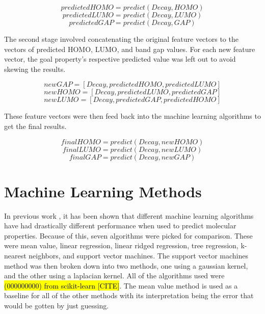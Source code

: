 \documentclass[10pt]{article}
\begin{document}
$$ predictedHOMO = predict(Decay, HOMO) $$
$$ predictedLUMO = predict(Decay, LUMO) $$
$$ predictedGAP = predict(Decay, GAP) $$

The second stage involved concatenating the original feature vectors to the vectors of predicted HOMO, LUMO, and band gap values. For each new feature vector, the goal property's respective predicted value was left out to avoid skewing the results.

$$ newGAP = [Decay, predictedHOMO, predictedLUMO] $$
$$ newHOMO = [Decay, predictedLUMO, predictedGAP] $$
$$ newLUMO = [Decay, predictedGAP, predictedHOMO] $$

These feature vectors were then feed back into the machine learning algorithms to get the final results.

$$ finalHOMO = predict(Decay, newHOMO) $$
$$ finalLUMO = predict(Decay, newLUMO) $$
$$ finalGAP = predict(Decay, newGAP) $$

\section{Machine Learning Methods}

In previous work \cite{montavon_machine_2013}, it has been shown that different machine learning algorithms have had drastically different performance when used to predict molecular properties. Because of this, seven algorithms were picked for comparison. These were mean value, linear regression, linear ridged regression, tree regression, k-nearest neighbors, and support vector machines. The support vector machines method was then broken down into two methods, one using a gaussian kernel, and the other using a laplacian kernel. All of the algorithms used were \hl{(000000000) from scikit-learn [CITE]}. The mean value method is used as a baseline for all of the other methods with its interpretation being the error that would be gotten by just guessing.
\end{document}
